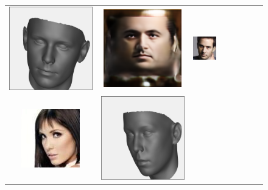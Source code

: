 \begin{figure}[t!]
\begin{center}
\begin{tabular}{ @{\hskip 1.5mm}c@{\hskip 1.5mm}c@{\hskip 1.5mm}c@{\hskip 1.5mm}c@{}c@{}c@{}c@{\hskip 1.5mm}c@{}}
\includegraphics[trim=3 3 3 3,clip,width=\FittingFigShapeWid]{img/results/CelebA/pred_CelebA_shape_159.png} &
\includegraphics[width=\FittingFigWid]{img/results/CelebA/pred_CelebA_tex_159.png} &
\includegraphics[width=\FittingFigWid]{img/results/CelebA/pred_CelebA_tex_159_img.png} &
\\
\includegraphics[width=\FittingFigWid]{img/results/CelebA/pred_CelebA_tex_245_in.png} &
\includegraphics[trim=3 3 3 3,clip,width=\FittingFigShapeWid]{img/results/CelebA/pred_CelebA_shape_245.png} &

\end{tabular}
\end{center}
\end{figure}
